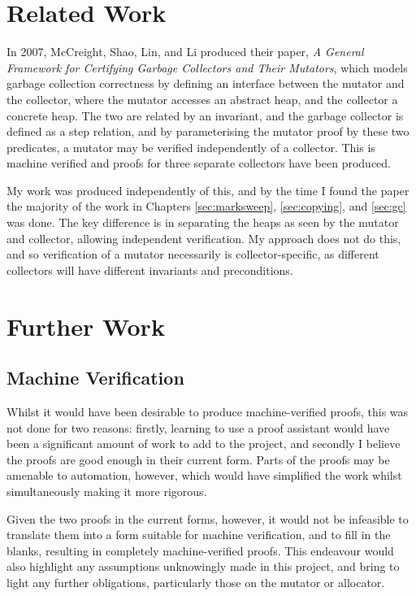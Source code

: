 \section{Related Work}
\label{sec:conclusion-related}

In 2007, McCreight, Shao, Lin, and Li produced their paper, \textit{A
  General Framework for Certifying Garbage Collectors and Their
  Mutators}\cite{McCreight07}, which models garbage collection
correctness by defining an interface between the mutator and the
collector, where the mutator accesses an abstract heap, and the
collector a concrete heap. The two are related by an invariant, and
the garbage collector is defined as a step relation, and by
parameterising the mutator proof by these two predicates, a mutator
may be verified independently of a collector. This is machine
verified and proofs for three separate collectors have been
produced.

My work was produced independently of this, and by the time I found
the paper the majority of the work in Chapters \ref{sec:marksweep},
\ref{sec:copying}, and \ref{sec:gc} was done. The key difference is in
separating the heaps as seen by the mutator and collector, allowing
independent verification. My approach does not do this, and so
verification of a mutator necessarily is collector-specific, as
different collectors will have different invariants and preconditions.

\section{Further Work}
\label{sec:conclusion-further}

\subsection{Machine Verification}
\label{sec:conclusion-further-machineverification}

Whilst it would have been desirable to produce machine-verified
proofs, this was not done for two reasons: firstly, learning to use a
proof assistant would have been a significant amount of work to add to
the project, and secondly I believe the proofs are good enough in
their current form. Parts of the proofs may be amenable to automation,
however, which would have simplified the work whilst simultaneously
making it more rigorous.

Given the two proofs in the current forms, however, it would not be
infeasible to translate them into a form suitable for machine
verification, and to fill in the blanks, resulting in completely
machine-verified proofs. This endeavour would also highlight any
assumptions unknowingly made in this project, and bring to light any
further obligations, particularly those on the mutator or allocator.

